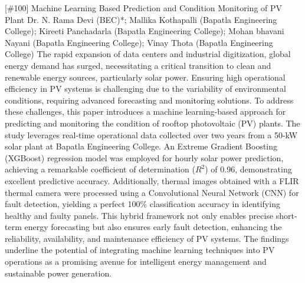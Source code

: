 {} \begin{abstract_online} {[\#100] Machine Learning Based Prediction and Condition Monitoring of PV Plant} {} {Dr. N. Rama Devi   (BEC)*; Mallika Kothapalli (Bapatla Engineering College); Kireeti Panchadarla (Bapatla Engineering College); Mohan bhavani Nayani (Bapatla Engineering College); Vinay Thota (Bapatla Engineering College)} {} The rapid expansion of data centers and industrial digitization, global energy demand has surged, necessitating a critical transition to clean and renewable energy sources, particularly solar power. Ensuring high operational efficiency in PV systems is challenging due to the variability of environmental conditions, requiring advanced forecasting and monitoring solutions. To address these challenges, this paper introduces a machine learning-based approach for predicting and monitoring the condition of rooftop photovoltaic (PV) plants. The study leverages real-time operational data collected over two years from a 50-kW solar plant at Bapatla Engineering College. An Extreme Gradient Boosting (XGBoost) regression model was employed for hourly solar power prediction, achieving a remarkable coefficient of determination ($R^2$) of 0.96, demonstrating excellent predictive accuracy. Additionally, thermal images obtained with a FLIR thermal camera were processed using a Convolutional Neural Network (CNN) for fault detection, yielding a perfect 100\% classification accuracy in identifying healthy and faulty panels. This hybrid framework not only enables precise short-term energy forecasting but also ensures early fault detection, enhancing the reliability, availability, and maintenance efficiency of PV systems. The findings underline the potential of integrating machine learning techniques into PV operations as a promising avenue for intelligent energy management and sustainable power generation. \end{abstract_online} 
